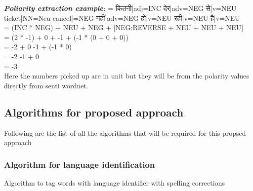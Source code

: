 \documentclass[12pt]{book}
\begin{document}
\textbf{\textit{Poliarity extraction example:}} 
\hspace{20em}= \foreignlanguage{sanskrit}{कितनी}|adj=INC
\foreignlanguage{sanskrit}{देर}|adv=NEG \foreignlanguage{sanskrit}{से}|v=NEU
ticket|NN=Neu cancel|=NEG \foreignlanguage{sanskrit}{नहीं}|adv=NEG
\foreignlanguage{sanskrit}{हो}|v=NEU  \foreignlanguage{sanskrit}{रही}|v=NEU
\foreignlanguage{sanskrit}{है}|v=NEU\\ 
\hspace{20em}= (INC * NEG) + NEU + NEG + [NEG:REVERSE + NEU + NEU + NEU]\\
\hspace{20em}= (2 * -1) + 0 + -1 + (-1 * (0 + 0 + 0))\\
\hspace{20em}= -2 + 0 -1 + (-1 * 0)\\
\hspace{20em}= -2 -1 + 0\\
\hspace{20em}= -3\\

Here the numbers picked up are in unit but they will be from the polarity
values directly from senti wordnet.


\subsection{Algorithms for proposed approach}

Following are the list of all the algorithms that will be required for this
propsed approach

\subsubsection{Algorithm for language identification}
Algorithm to tag words with language identifier with spelling corrections
\end{document}
